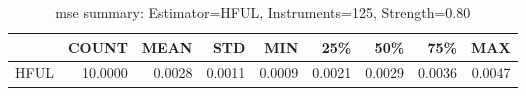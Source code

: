 \begin{table}[ht]
\centering
\caption{mse summary: Estimator=HFUL, Instruments=125, Strength=0.80}
\begin{tabular}{lrrrrrrrr}
\toprule
 & COUNT & MEAN & STD & MIN & 25\% & 50\% & 75\% & MAX \\
\midrule
HFUL & 10.0000 & 0.0028 & 0.0011 & 0.0009 & 0.0021 & 0.0029 & 0.0036 & 0.0047 \\
\bottomrule
\end{tabular}
\end{table}
